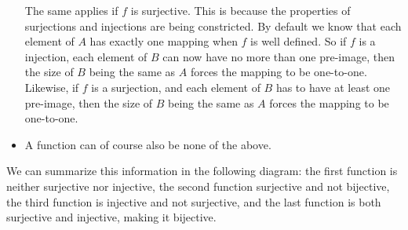 \documentclass[12pt]{article}
\begin{document}
\begin{itemize}[label=$\diamond$]
            The same applies if $f$ is surjective.
            This is because the properties of surjections and injections
            are being constricted.
            By default we know that each element of $A$
            has exactly one mapping when $f$ is well defined.
            So if $f$ is a injection,
            each element of $B$ can now have no more than one pre-image,
            then the size of $B$ being the same as $A$
            forces the mapping to be one-to-one.
            Likewise, if $f$ is a surjection,
            and each element of $B$ has to have at least one pre-image,
            then the size of $B$ being the same as $A$
            forces the mapping to be one-to-one.
        \item
            A function can of course also be none of the above.
    \end{itemize}
    We can summarize this information in the following diagram:
    the first function is neither surjective nor injective,
    the second function surjective and not bijective,
    the third function is injective and not surjective,
    and the last function is both surjective and injective,
    making it bijective.
    
\end{document}
